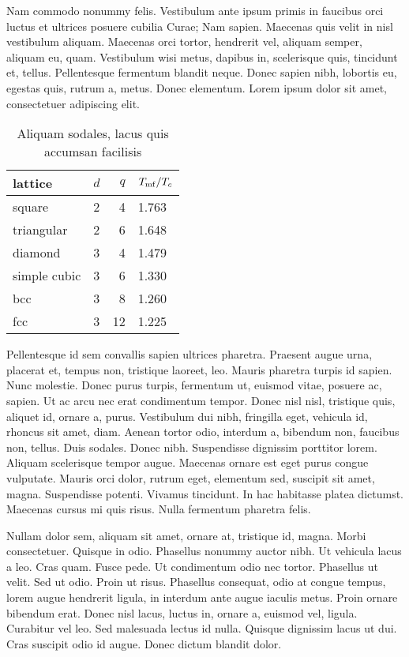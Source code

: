  \debutannexes
{} \label{appendix:one}

Nam commodo nonummy felis. Vestibulum ante ipsum primis in
faucibus orci luctus et ultrices posuere cubilia Curae; Nam
sapien. Maecenas quis velit in nisl vestibulum aliquam. Maecenas
orci tortor, hendrerit vel, aliquam semper, aliquam eu, quam.
Vestibulum wisi metus, dapibus in, scelerisque quis, tincidunt et,
tellus. Pellentesque fermentum blandit neque. Donec sapien nibh,
lobortis eu, egestas quis, rutrum a, metus. Donec elementum. Lorem
ipsum dolor sit amet, consectetuer adipiscing elit.



\begin{table}[h]
\begin{center}
\begin{tabular}{|l|l|r|l|}
\hline
lattice & $d$ & $q$ & $T_{\rm mf}/T_c$ \\
\hline
square & 2 & 4 & 1.763 \\
\hline
triangular & 2 & 6 & 1.648 \\
\hline
diamond & 3 & 4 & 1.479 \\
\hline
simple cubic & 3 & 6 & 1.330 \\
\hline
bcc & 3 & 8 & 1.260 \\
\hline
fcc & 3 & 12 & 1.225 \\
\hline
\end{tabular}
\caption{\label{tab:5/tc}Aliquam sodales, lacus quis accumsan
facilisis}
\end{center}
\end{table}

Pellentesque id sem convallis sapien ultrices pharetra. Praesent
augue urna, placerat et, tempus non, tristique laoreet, leo.
Mauris pharetra turpis id sapien. Nunc molestie. Donec purus
turpis, fermentum ut, euismod vitae, posuere ac, sapien. Ut ac
arcu nec erat condimentum tempor. Donec nisl nisl, tristique quis,
aliquet id, ornare a, purus. Vestibulum dui nibh, fringilla eget,
vehicula id, rhoncus sit amet, diam. Aenean tortor odio, interdum
a, bibendum non, faucibus non, tellus. Duis sodales. Donec nibh.
Suspendisse dignissim porttitor lorem. Aliquam scelerisque tempor
augue. Maecenas ornare est eget purus congue vulputate. Mauris
orci dolor, rutrum eget, elementum sed, suscipit sit amet, magna.
Suspendisse potenti. Vivamus tincidunt. In hac habitasse platea
dictumst. Maecenas cursus mi quis risus. Nulla fermentum pharetra
felis.

Nullam dolor sem, aliquam sit amet, ornare at, tristique id,
magna. Morbi consectetuer. Quisque in odio. Phasellus nonummy
auctor nibh. Ut vehicula lacus a leo. Cras quam. Fusce pede. Ut
condimentum odio nec tortor. Phasellus ut velit. Sed ut odio.
Proin ut risus. Phasellus consequat, odio at congue tempus, lorem
augue hendrerit ligula, in interdum ante augue iaculis metus.
Proin ornare bibendum erat. Donec nisl lacus, luctus in, ornare a,
euismod vel, ligula. Curabitur vel leo. Sed malesuada lectus id
nulla. Quisque dignissim lacus ut dui. Cras suscipit odio id
augue. Donec dictum blandit dolor.
